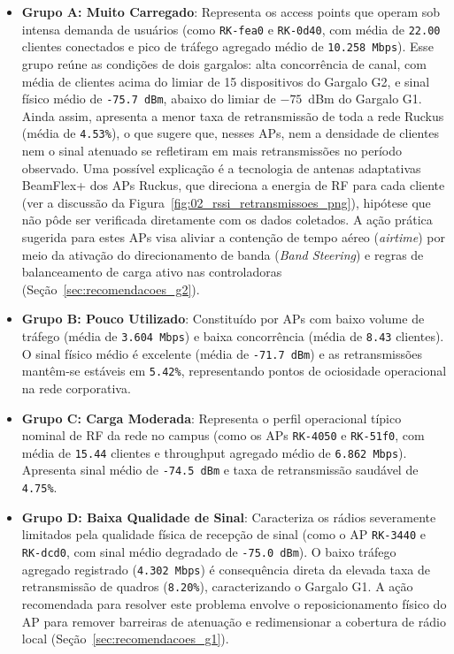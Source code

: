 \begin{itemize}
  \item \textbf{Grupo A: Muito Carregado}: Representa os access points que operam sob intensa demanda de usuários (como \texttt{RK-fea0} e \texttt{RK-0d40}, com média de \texttt{22.00} clientes conectados e pico de tráfego agregado médio de \texttt{10.258 Mbps}). Esse grupo reúne as condições de dois gargalos: alta concorrência de canal, com média de clientes acima do limiar de 15 dispositivos do Gargalo G2, e sinal físico médio de \texttt{-75.7 dBm}, abaixo do limiar de $-75$~dBm do Gargalo G1. Ainda assim, apresenta a menor taxa de retransmissão de toda a rede Ruckus (média de \texttt{4.53\%}), o que sugere que, nesses APs, nem a densidade de clientes nem o sinal atenuado se refletiram em mais retransmissões no período observado. Uma possível explicação é a tecnologia de antenas adaptativas BeamFlex+ dos APs Ruckus, que direciona a energia de RF para cada cliente \cite{ruckus2018r600} (ver a discussão da Figura~\ref{fig:02_rssi_retransmissoes_png}), hipótese que não pôde ser verificada diretamente com os dados coletados. A ação prática sugerida para estes APs visa aliviar a contenção de tempo aéreo (\textit{airtime}) por meio da ativação do direcionamento de banda (\textit{Band Steering}) e regras de balanceamento de carga ativo nas controladoras (Seção~\ref{sec:recomendacoes_g2}).
  \item \textbf{Grupo B: Pouco Utilizado}: Constituído por APs com baixo volume de tráfego (média de \texttt{3.604 Mbps}) e baixa concorrência (média de \texttt{8.43} clientes). O sinal físico médio é excelente (média de \texttt{-71.7 dBm}) e as retransmissões mantêm-se estáveis em \texttt{5.42\%}, representando pontos de ociosidade operacional na rede corporativa.
  \item \textbf{Grupo C: Carga Moderada}: Representa o perfil operacional típico nominal de RF da rede no campus (como os APs \texttt{RK-4050} e \texttt{RK-51f0}, com média de \texttt{15.44} clientes e throughput agregado médio de \texttt{6.862 Mbps}). Apresenta sinal médio de \texttt{-74.5 dBm} e taxa de retransmissão saudável de \texttt{4.75\%}.
  \item \textbf{Grupo D: Baixa Qualidade de Sinal}: Caracteriza os rádios severamente limitados pela qualidade física de recepção de sinal (como o AP \texttt{RK-3440} e \texttt{RK-dcd0}, com sinal médio degradado de \texttt{-75.0 dBm}). O baixo tráfego agregado registrado (\texttt{4.302 Mbps}) é consequência direta da elevada taxa de retransmissão de quadros (\texttt{8.20\%}), caracterizando o Gargalo G1. A ação recomendada para resolver este problema envolve o reposicionamento físico do AP para remover barreiras de atenuação e redimensionar a cobertura de rádio local (Seção~\ref{sec:recomendacoes_g1}).

\end{itemize}
